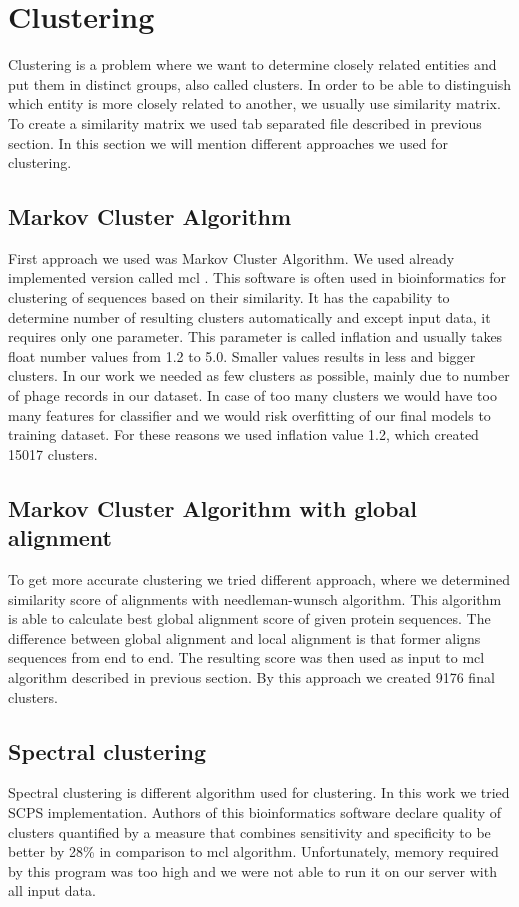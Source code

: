 \section{Clustering}
Clustering is a problem where we want to determine closely related entities and put them in distinct groups, also called clusters.
In order to be able to distinguish which entity is more closely related to another, we usually use similarity matrix.
To create a similarity matrix we used tab separated file described in previous section.
In this section we will mention different approaches we used for clustering. 
\subsection{Markov Cluster Algorithm}
First approach we used was Markov Cluster Algorithm. 
We used already implemented version called mcl \cite{mcl}.
This software is often used in bioinformatics for clustering of sequences based on their similarity.
It has the capability to determine number of resulting clusters automatically and except input data, it requires only one parameter.
This parameter is called inflation and usually takes float number values from 1.2 to 5.0.
Smaller values results in less and bigger clusters.
In our work we needed as few clusters as possible, mainly due to number of phage records in our dataset.
In case of too many clusters we would have too many features for classifier and we would risk overfitting of our final models to training dataset.
For these reasons we used inflation value 1.2, which created 15017 clusters.

\subsection{Markov Cluster Algorithm with global alignment}
To get more accurate clustering we tried different approach, where we determined similarity score of alignments with needleman-wunsch algorithm. \cite{needleman-wunsch}
This algorithm is able to calculate best global alignment score of given protein sequences.
The difference between global alignment and local alignment is that former aligns sequences from end to end.
The resulting score was then used as input to mcl algorithm described in previous section.
By this approach we created 9176 final clusters.

\subsection{Spectral clustering}
Spectral clustering is different algorithm used for clustering.
In this work we tried SCPS implementation\cite{scps}.
Authors of this bioinformatics software declare quality of clusters quantified by a measure that combines sensitivity and specificity to be better by 28\% in comparison to mcl algorithm.
Unfortunately, memory required by this program was too high and we were not able to run it on our server with all input data. 

